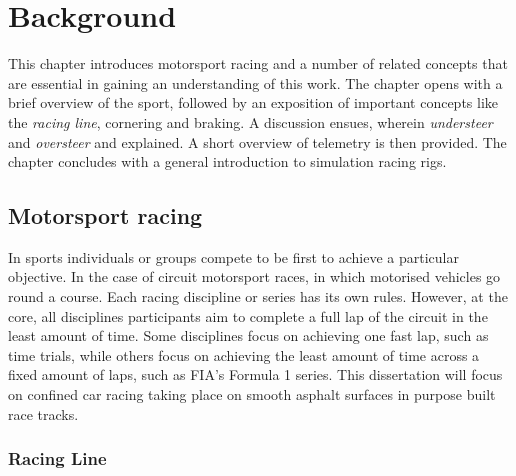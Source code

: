 \chapter{Background}
\label{sec:background}

This chapter introduces motorsport racing and a number of related concepts that are essential in gaining an understanding of this work. The chapter opens with a brief overview of the sport, followed by an exposition of important concepts like the \emph{racing line}, cornering and braking. A discussion ensues, wherein \emph{understeer} and \emph{oversteer} and explained. A short overview of telemetry is then provided. The chapter concludes with a general introduction to simulation racing rigs.

\section{Motorsport racing}
In sports individuals or groups compete to be first to achieve a particular objective. In the case of circuit motorsport races, in which motorised vehicles go round a course. Each racing discipline or series has its own rules. However, at the core, all disciplines participants aim to complete a full lap of the circuit in the least amount of time. Some disciplines focus on achieving one fast lap, such as time trials, while others focus on achieving the least amount of time across a fixed amount of laps, such as FIA's Formula 1 series. This dissertation will focus on confined car racing taking place on smooth asphalt surfaces in purpose built race tracks. 

\subsection{Racing Line}

